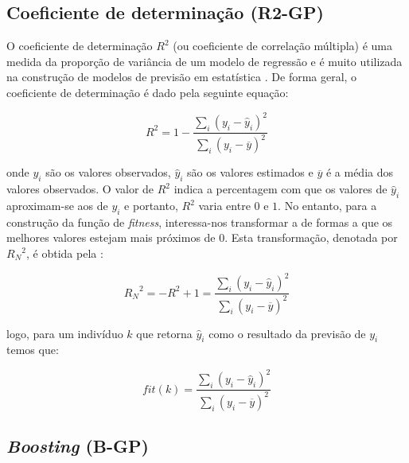 \subsection{Coeficiente de determinação (R2-GP)}
\label{R2GP}

O coeficiente de determinação $R^2$ (ou coeficiente de correlação múltipla) é uma medida da proporção de variância de um
modelo de regressão e é muito utilizada na construção de modelos de previsão em estatística  \citep{nagelkerke1991note}.
De forma geral, o coeficiente de determinação é dado pela seguinte equação:

\begin{equation}
R^2 = 1 - \frac{\sum_i(y_i - \hat{y}_i)^2}{\sum_i(y_i - \overline{y})^2}
\label{Equacao5310}
\end{equation}

\noindent onde $y_i$ são os valores observados, $\hat{y}_i$ são os valores estimados e $\overline{y}$ é a média dos valores
observados. O valor de $R^2$ indica a percentagem com que os valores de $\hat{y}_i$ aproximam-se aos de $y_i$
e portanto, $R^2$ varia entre $0$ e $1$. No entanto, para a construção da função de \emph{fitness}, interessa-nos transformar
a  de formas a que os melhores valores estejam mais próximos de $0$. Esta transformação, 
denotada por ${R_N}^2$, é obtida pela :

\begin{equation}
{R_N}^2 = -R^2 + 1 = \frac{\sum_i(y_i - \hat{y}_i)^2}{\sum_i(y_i - \overline{y})^2}
\label{Equacao5311}
\end{equation}

\noindent logo, para um indivíduo $k$ que retorna $\hat{y}_i$ como o resultado da previsão de $y_i$ temos que:

\begin{equation}
fit(k) = \frac{\sum_i(y_i - \hat{y}_i)^2}{\sum_i(y_i - \overline{y})^2}
\label{Equacao5312}
\end{equation}

\subsection{\emph{Boosting} (B-GP)}
\label{BGP}

